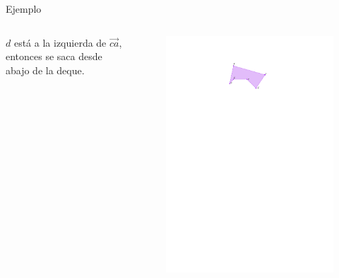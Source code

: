 \documentclass[aspectratio=169,xcolor=dvipsnames, t]{beamer}
\begin{document}
\begin{frame}{Ejemplo}
  \begin{columns}
    \begin{column}{0.5\textwidth}
      $d$ está a la izquierda de $\overrightarrow{ca}$, entonces se saca desde abajo de la deque.
    \end{column}
    \begin{column}{0.5\textwidth}
      \begin{figure}
        \centering
        \includegraphics[width=\linewidth, height=0.5\textheight, page=6, keepaspectratio]{IPE/Melkman.pdf}
      \end{figure}
    \end{column}
  \end{columns}
\end{frame}
\end{document}
